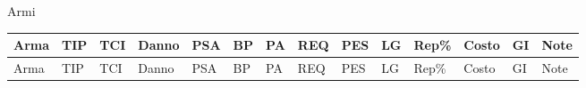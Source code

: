 {\setlength{\tabcolsep}{0.2em}
\centering

{\Large\sc Armi}
\label{tabarmi}

\footnotesize
\begin{longtable}{|p{1.5cm}|p{0.7cm}|p{0.9cm}|p{0.9cm}|l|l|l|p{0.9cm}|p{0.8cm}|p{1.0cm}|l|l|p{0.75cm}|p{3.2cm}|}
  \par
  \hline
  Arma& \raggedright TIP& \raggedright TCI& \raggedright Danno& \raggedright PSA& \raggedright BP& \raggedright PA& \raggedright REQ& \raggedright PES& \raggedright LG& \raggedright Rep\%& \raggedright Costo& \raggedright GI& \raggedright Note\tabularnewline \hline\hline
  \endfirsthead
  \hline
  Arma& \raggedright TIP& \raggedright TCI& \raggedright Danno& \raggedright PSA& \raggedright BP& \raggedright PA& \raggedright REQ& \raggedright PES& \raggedright LG& \raggedright Rep\%& \raggedright Costo& \raggedright GI& \raggedright Note\tabularnewline \hline\hline
  \endhead
  

\end{longtable}}

